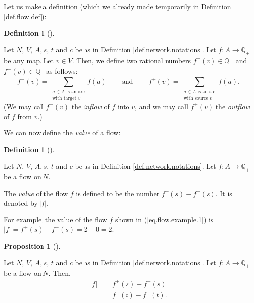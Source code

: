 \documentclass[numbers=enddot,12pt,final,onecolumn,notitlepage]{scrartcl}%
\theoremstyle{definition}
\newtheorem{prop}[theo]{Proposition}
\newenvironment{proposition}[1][]
{\begin{prop}[#1]\begin{leftbar}}
{\end{leftbar}\end{prop}}
\newtheorem{defi}[theo]{Definition}
\newenvironment{definition}[1][]
{\begin{defi}[#1]\begin{leftbar}}
{\end{leftbar}\end{defi}}
\let\sumnonlimits\sum
\renewcommand{\sum}{\sumnonlimits\limits}
\begin{document}
Let us make a definition (which we already made temporarily in Definition
\ref{def.flow.def}):

\begin{definition}
\label{def.f-f+}Let $N$, $V$, $A$, $s$, $t$ and $c$ be as in Definition
\ref{def.network.notations}. Let $f:A\rightarrow\mathbb{Q}_{+}$ be any map.
Let $v\in V$. Then, we define two rational numbers $f^{-}\left(  v\right)
\in\mathbb{Q}_{+}$ and $f^{+}\left(  v\right)  \in\mathbb{Q}_{+}$ as follows:%
\[
f^{-}\left(  v\right)  =\sum_{\substack{a\in A\text{ is an arc}\\\text{with
target }v}}f\left(  a\right)  \ \ \ \ \ \ \ \ \ \ \text{and}%
\ \ \ \ \ \ \ \ \ \ f^{+}\left(  v\right)  =\sum_{\substack{a\in A\text{ is an
arc}\\\text{with source }v}}f\left(  a\right)  .
\]
(We may call $f^{-}\left(  v\right)  $ the \textit{inflow} of $f$ into $v$,
and we may call $f^{+}\left(  v\right)  $ the \textit{outflow} of $f$ from $v$.)
\end{definition}

We can now define the \textit{value} of a flow:

\begin{definition}
\label{def.flow.value}Let $N$, $V$, $A$, $s$, $t$ and $c$ be as in Definition
\ref{def.network.notations}. Let $f:A\rightarrow\mathbb{Q}_{+}$ be a flow on
$N$.

The \textit{value} of the flow $f$ is defined to be the number $f^{+}\left(
s\right)  -f^{-}\left(  s\right)  $. It is denoted by $\left\vert f\right\vert
$.
\end{definition}

For example, the value of the flow $f$ shown in (\ref{eq.flow.example.1}) is
$\left\vert f\right\vert =f^{+}\left(  s\right)  -f^{-}\left(  s\right)
=2-0=2$.

\begin{proposition}
\label{prop.1}Let $N$, $V$, $A$, $s$, $t$ and $c$ be as in Definition
\ref{def.network.notations}. Let $f:A\rightarrow\mathbb{Q}_{+}$ be a flow on
$N$. Then,%
\begin{align}
\left\vert f\right\vert  &  =f^{+}\left(  s\right)  -f^{-}\left(  s\right)
\label{eq.prop.1.1}\\
&  =f^{-}\left(  t\right)  -f^{+}\left(  t\right)  . \label{eq.prop.1.2}%
\end{align}

\end{proposition}
\end{document}
